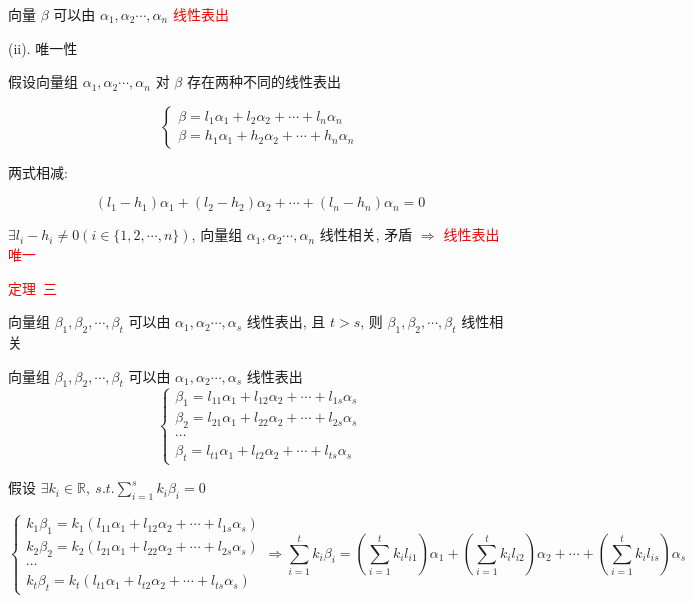 \begin{theorem}[判别线性相关性的七大定理]
\begin{anymark}[证明]
		向量 $\beta$ 可以由 $\alpha_{1},\alpha_{2}\cdots,\alpha_{n}$ \textcolor{red}{线性表出}
		
		(ii). 唯一性
		
		假设向量组 $\alpha_{1},\alpha_{2}\cdots,\alpha_{n}$ 对 $\beta$ 存在两种不同的线性表出  
		
		$$\begin{cases}
			\beta=l_{1}\alpha_{1}+l_{2}\alpha_{2}+\cdots+l_{n}\alpha_{n}\\
			\beta=h_{1}\alpha_{1}+h_{2}\alpha_{2}+\cdots+h_{n}\alpha_{n}
		\end{cases}$$

		两式相减:  

		$$(l_{1}-h_{1})\alpha_{1}+(l_{2}-h_{2})\alpha_{2}+\cdots+(l_{n}-h_{n})\alpha_{n}=0$$

		$\exists l_{i}-h_{i}\neq 0(i\in\{1,2,\cdots,n\})$, 向量组 $\alpha_{1},\alpha_{2}\cdots,\alpha_{n}$ 线性相关, 矛盾 $\Rightarrow$ \textcolor{red}{线性表出唯一}
	\end{anymark}

	\textcolor{red}{定理\ 三}
	
	向量组 $\beta_{1},\beta_{2},\cdots,\beta_{t}$ 可以由 $\alpha_{1},\alpha_{2}\cdots,\alpha_{s}$ 线性表出, 且 $t > s$, 则 $\beta_{1},\beta_{2},\cdots,\beta_{t}$ 线性相关
	
	\begin{anymark}[证明]
		
		向量组 $\beta_{1},\beta_{2},\cdots,\beta_{t}$ 可以由 $\alpha_{1},\alpha_{2}\cdots,\alpha_{s}$ 线性表出  
		$$\begin{cases}
		    \beta_{1}=l_{11}\alpha_{1}+l_{12}\alpha_{2}+\cdots+l_{1s}\alpha_{s}\\
			\beta_{2}=l_{21}\alpha_{1}+l_{22}\alpha_{2}+\cdots+l_{2s}\alpha_{s}\\
			\cdots\\
			\beta_{t}=l_{t1}\alpha_{1}+l_{t2}\alpha_{2}+\cdots+l_{ts}\alpha_{s}
		\end{cases}$$

		假设 $\exists k_{i}\in \mathbb{R},\ s.t. \sum\limits_{i=1}^{s}k_{i}\beta_{i} = 0$
		
		$$\begin{cases}
		  k_{1}\beta_{1} = k_{1}(l_{11}\alpha_{1}+l_{12}\alpha_{2}+\cdots+l_{1s}\alpha_{s})\\
		  k_{2}\beta_{2} = k_{2}(l_{21}\alpha_{1}+l_{22}\alpha_{2}+\cdots+l_{2s}\alpha_{s})\\
		  \cdots\\
		  k_{t}\beta_{t} = k_{t}(l_{t1}\alpha_{1}+l_{t2}\alpha_{2}+\cdots+l_{ts}\alpha_{s})
		\end{cases}\Rightarrow 
		\sum_{i=1}^{t}k_{i}\beta_{i} = (\sum\limits_{i=1}^{t}k_{i}l_{i1})\alpha_{1}+(\sum\limits_{i=1}^{t}k_{i}l_{i2})\alpha_{2}+\cdots+(\sum\limits_{i=1}^{t}k_{i}l_{is})\alpha_{s}
		$$
		

\end{anymark}
\end{theorem}
